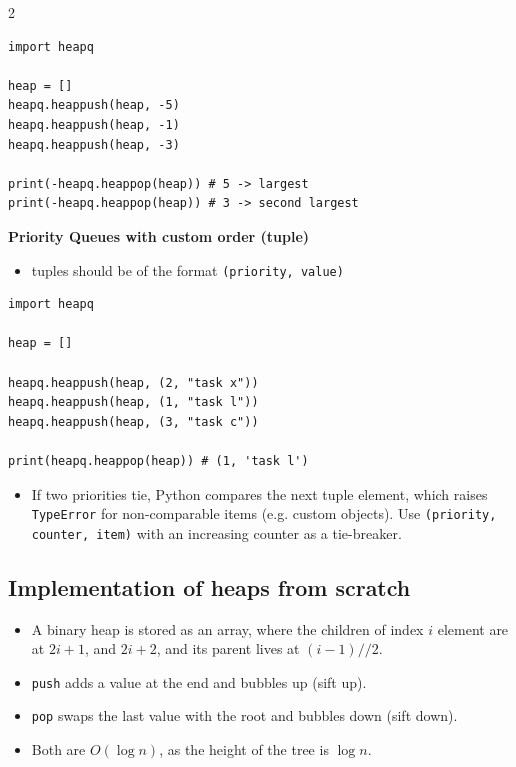 \documentclass[9pt,a4paper]{extarticle}
\newlength{\tw}
\begin{document}
\begin{multicols}{2}
\begin{lstlisting}
import heapq

heap = []
heapq.heappush(heap, -5)
heapq.heappush(heap, -1)
heapq.heappush(heap, -3)

print(-heapq.heappop(heap)) # 5 -> largest
print(-heapq.heappop(heap)) # 3 -> second largest
\end{lstlisting}

\noindent\textbf{Priority Queues with custom order (tuple)}\par\nopagebreak\vspace{1pt}

\begin{itemize}
\item tuples should be of the format \texttt{(\allowbreak{}priority,\allowbreak{} value)}
\end{itemize}

\begin{lstlisting}
import heapq

heap = []

heapq.heappush(heap, (2, "task x"))
heapq.heappush(heap, (1, "task l"))
heapq.heappush(heap, (3, "task c"))

print(heapq.heappop(heap)) # (1, 'task l')
\end{lstlisting}

\begin{itemize}
\item If two priorities tie, Python compares the next tuple element, which raises \texttt{TypeError} for non-comparable items (e.g. custom objects). Use \texttt{(\allowbreak{}priority,\allowbreak{} counter,\allowbreak{} item)} with an increasing counter as a tie-breaker.
\end{itemize}

\subsection{Implementation of heaps from scratch}

\begin{itemize}
\item A binary heap is stored as an array, where the children of index $i$ element are at $2i + 1$, and $2i + 2$, and its parent lives at $(i-1)//2$.
\item \texttt{push} adds a value at the end and bubbles up (sift up).
\item \texttt{pop} swaps the last value with the root and bubbles down (sift down).
\item Both are $O(\log n)$, as the height of the tree is $\log n$.
\end{itemize}


\end{multicols}
\end{document}
